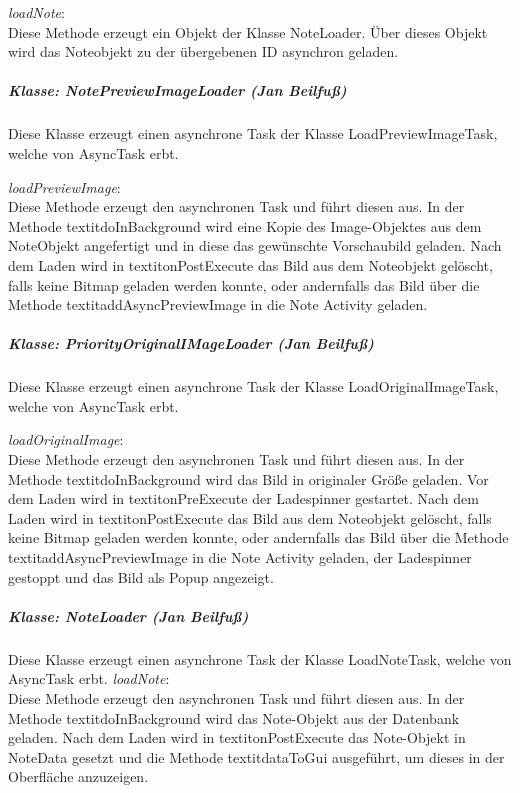 \textit{loadNote}:\\
Diese Methode erzeugt ein Objekt der Klasse NoteLoader. Über dieses Objekt wird das Noteobjekt zu der übergebenen ID asynchron geladen.

\subparagraph*{Klasse: NotePreviewImageLoader (Jan Beilfuß)}
Diese Klasse erzeugt einen asynchrone Task der Klasse LoadPreviewImageTask, welche von AsyncTask erbt.

\textit{loadPreviewImage}:\\
Diese Methode erzeugt den asynchronen Task und führt diesen aus. In der Methode textit{doInBackground} wird eine Kopie des Image-Objektes aus dem NoteObjekt angefertigt und in diese das gewünschte Vorschaubild geladen. Nach dem Laden wird in textit{onPostExecute} das Bild aus dem Noteobjekt gelöscht, falls keine Bitmap geladen werden konnte, oder andernfalls das Bild über die Methode textit{addAsyncPreviewImage} in die Note Activity geladen.

\subparagraph*{Klasse: PriorityOriginalIMageLoader (Jan Beilfuß)}
Diese Klasse erzeugt einen asynchrone Task der Klasse LoadOriginalImageTask, welche von AsyncTask erbt.

\textit{loadOriginalImage}:\\
Diese Methode erzeugt den asynchronen Task und führt diesen aus. In der Methode textit{doInBackground} wird das Bild in originaler Größe geladen. Vor dem Laden wird in textit{onPreExecute} der Ladespinner gestartet. Nach dem Laden wird in textit{onPostExecute} das Bild aus dem Noteobjekt gelöscht, falls keine Bitmap geladen werden konnte, oder andernfalls das Bild über die Methode textit{addAsyncPreviewImage} in die Note Activity geladen, der Ladespinner gestoppt und das Bild als Popup angezeigt.

\subparagraph*{Klasse: NoteLoader (Jan Beilfuß)}
Diese Klasse erzeugt einen asynchrone Task der Klasse LoadNoteTask, welche von AsyncTask erbt.
\textit{loadNote}:\\
Diese Methode erzeugt den asynchronen Task und führt diesen aus. In der Methode textit{doInBackground} wird das Note-Objekt aus der Datenbank geladen. Nach dem Laden wird in textit{onPostExecute} das Note-Objekt in NoteData gesetzt und die Methode textit{dataToGui} ausgeführt, um dieses in der Oberfläche anzuzeigen.

